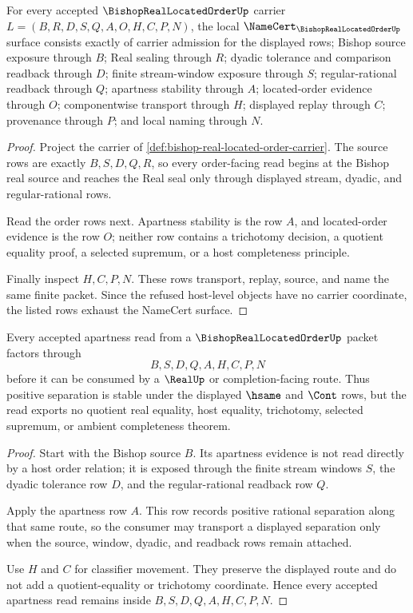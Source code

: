 \begin{theorem}
\label{thm:bishop-real-located-order-namecert-obligations}
For every accepted $\BishopRealLocatedOrderUp$ carrier $L=(B,R,D,S,Q,A,O,H,C,P,N)$, the local $\NameCert_{\BishopRealLocatedOrderUp}$ surface consists exactly of carrier admission for the displayed rows; Bishop source exposure through $B$; Real sealing through $R$; dyadic tolerance and comparison readback through $D$; finite stream-window exposure through $S$; regular-rational readback through $Q$; apartness stability through $A$; located-order evidence through $O$; componentwise transport through $H$; displayed replay through $C$; provenance through $P$; and local naming through $N$.
\end{theorem}
\begin{proof}
Project the carrier of \autoref{def:bishop-real-located-order-carrier}. The source rows are exactly $B,S,D,Q,R$, so every order-facing read begins at the Bishop real source and reaches the Real seal only through displayed stream, dyadic, and regular-rational rows.

Read the order rows next. Apartness stability is the row $A$, and located-order evidence is the row $O$; neither row contains a trichotomy decision, a quotient equality proof, a selected supremum, or a host completeness principle.

Finally inspect $H,C,P,N$. These rows transport, replay, source, and name the same finite packet. Since the refused host-level objects have no carrier coordinate, the listed rows exhaust the NameCert surface.
\end{proof}

\begin{theorem}
\label{thm:bishop-real-located-order-apartness-stability}
Every accepted apartness read from a $\BishopRealLocatedOrderUp$ packet factors through
$$
B,S,D,Q,A,H,C,P,N
$$
before it can be consumed by a $\RealUp$ or completion-facing route. Thus positive separation is stable under the displayed $\hsame$ and $\Cont$ rows, but the read exports no quotient real equality, host equality, trichotomy, selected supremum, or ambient completeness theorem.
\end{theorem}
\begin{proof}
Start with the Bishop source $B$. Its apartness evidence is not read directly by a host order relation; it is exposed through the finite stream windows $S$, the dyadic tolerance row $D$, and the regular-rational readback row $Q$.

Apply the apartness row $A$. This row records positive rational separation along that same route, so the consumer may transport a displayed separation only when the source, window, dyadic, and readback rows remain attached.

Use $H$ and $C$ for classifier movement. They preserve the displayed route and do not add a quotient-equality or trichotomy coordinate. Hence every accepted apartness read remains inside $B,S,D,Q,A,H,C,P,N$.
\end{proof}

